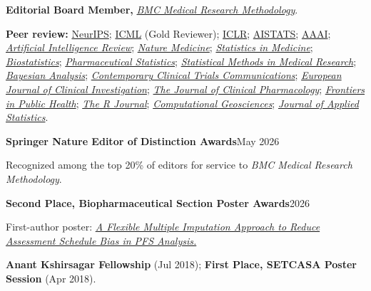 \documentclass[11pt,letterpaper]{article}
\newcommand{\compactcvsection}[1]{\par\addvspace{5pt}\Needspace{4\baselineskip}{\color{accent}\large\bfseries #1}\par\vspace{2pt}{\color{accent}\hrule height 0.45pt}\vspace{3pt}}
\begin{document}
\compactcvsection{Editorial Service \& Honors}
\textbf{Editorial Board Member,} \href{https://link.springer.com/journal/12874/editorial-board}{\textit{BMC Medical Research Methodology}}.\par\vspace{4pt}
\textbf{Peer review:} \href{https://neurips.cc/}{NeurIPS}; \href{https://icml.cc/}{ICML} (Gold Reviewer); \href{https://iclr.cc/}{ICLR}; \href{https://aistats.org/}{AISTATS}; \href{https://aaai.org/conference/aaai/}{AAAI}; \href{https://link.springer.com/journal/10462}{\textit{Artificial Intelligence Review}}; \href{https://www.nature.com/nm/}{\textit{Nature Medicine}}; \href{https://onlinelibrary.wiley.com/journal/10970258}{\textit{Statistics in Medicine}}; \href{https://academic.oup.com/biostatistics}{\textit{Biostatistics}}; \href{https://onlinelibrary.wiley.com/journal/15391612}{\textit{Pharmaceutical Statistics}}; \href{https://journals.sagepub.com/home/smm}{\textit{Statistical Methods in Medical Research}}; \href{https://projecteuclid.org/journals/bayesian-analysis}{\textit{Bayesian Analysis}}; \href{https://www.sciencedirect.com/journal/contemporary-clinical-trials-communications}{\textit{Contemporary Clinical Trials Communications}}; \href{https://onlinelibrary.wiley.com/journal/13652362}{\textit{European Journal of Clinical Investigation}}; \href{https://accp1.onlinelibrary.wiley.com/journal/15524604}{\textit{The Journal of Clinical Pharmacology}}; \href{https://www.frontiersin.org/journals/public-health}{\textit{Frontiers in Public Health}}; \href{https://journal.r-project.org/}{\textit{The R Journal}}; \href{https://www.springer.com/journal/10596}{\textit{Computational Geosciences}}; \href{https://www.tandfonline.com/journals/cjas20}{\textit{Journal of Applied Statistics}}.\par\vspace{4pt}
\textbf{Springer Nature Editor of Distinction Awards}\hfill May 2026\par
Recognized among the top 20\% of editors for service to \textit{BMC Medical Research Methodology}.\par\vspace{4pt}
\textbf{Second Place, Biopharmaceutical Section Poster Awards}\hfill 2026\par
First-author poster: \href{https://ww2.amstat.org/meetings/jsm/2026/onlineprogram/abstract.cfm?sid=8715&tid=8887}{\textit{A Flexible Multiple Imputation Approach to Reduce Assessment Schedule Bias in PFS Analysis.}}\par\vspace{4pt}
\textbf{Anant Kshirsagar Fellowship} (Jul 2018); \textbf{First Place, SETCASA Poster Session} (Apr 2018).
\end{document}
